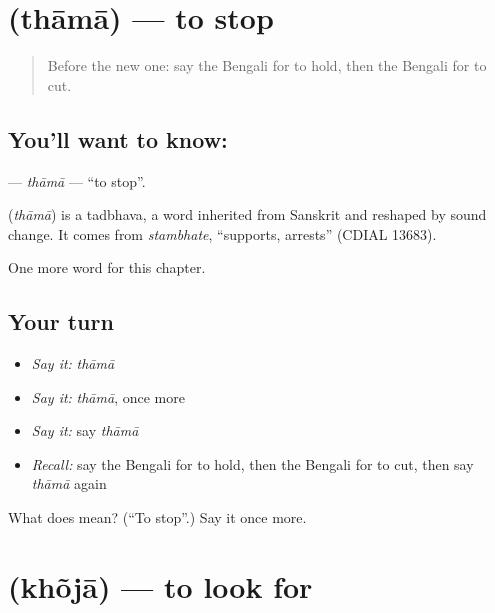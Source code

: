 \section[\texorpdfstring{\bn{থামা} (thāmā)}{থামা (thāmā)}]{ (thāmā) — to stop}

\label{lesson:BN-C52-thama}



\begin{quote}
Before the new one: say the Bengali for to hold, then the Bengali for to cut.
\end{quote}

\subsection*{You'll want to know: }
\textbf{} — \emph{thāmā} — \textquotedblleft{}to stop\textquotedblright{}.

\begin{cousinweb}
\textbf{} (\emph{thāmā}) is a tadbhava, a word inherited from Sanskrit and reshaped by sound change. It comes from \emph{stambhate}, \textquotedblleft{}supports, arrests\textquotedblright{} (CDIAL 13683).
\end{cousinweb}

\begin{grammarlens}[title={What you've built}]
One more word for this chapter.
\end{grammarlens}

\subsection*{Your turn}
\begin{itemize}
\raggedright
  \item \emph{Say it:} \emph{thāmā}
  \item \emph{Say it:} \emph{thāmā}, once more
  \item \emph{Say it:} say \emph{thāmā}
  \item \emph{Recall:} say the Bengali for to hold, then the Bengali for to cut, then say \emph{thāmā} again
\end{itemize}

\begin{tcolorbox}[breakable,colback=teal!4,colframe=teal!35!black,title={Before you move on}]
What does  mean? (\textquotedblleft{}To stop\textquotedblright{}.) Say it once more.
\end{tcolorbox}
\section[\texorpdfstring{\bn{খোঁজা} (khõjā)}{খোঁজা (khõjā)}]{ (khõjā) — to look for}

